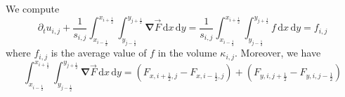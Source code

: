 \documentclass[aps,onecolumn]{revtex4}
\newcommand{\half}{\frac{1}{2}}
\newcommand{\myd}{\,\text{d}}
\begin{document}
We compute
\begin{equation}
	\partial_t u_{i,j} + \dfrac{1}{s_{i,j}} \int_{x_{i-\half}}^{x_{i+\half}} \int_{y_{j-\half}}^{y_{j+\half}} {\bm \nabla} \vec{F} \myd x \myd y
	 = \dfrac{1}{s_{i,j}} \int_{x_{i-\half}}^{x_{i+\half}} \int_{y_{j-\half}}^{y_{j+\half}} f \myd x \myd y = f_{i,j}
\end{equation}
where $f_{i,j}$ is the average value of $f$ in the volume $\kappa_{i,j}$.
Moreover, we have
\begin{equation}
\int_{x_{i-\half}}^{x_{i+\half}} \int_{y_{j-\half}}^{y_{j+\half}} {\bm \nabla} \vec{F} \myd x \myd y = 
\left( F_{x,i+\half,j} - F_{x,i-\half,j} \right) + \left( F_{y,i,j+\half} - F_{y,i,j-\half} \right) 
\end{equation}
\end{document}
